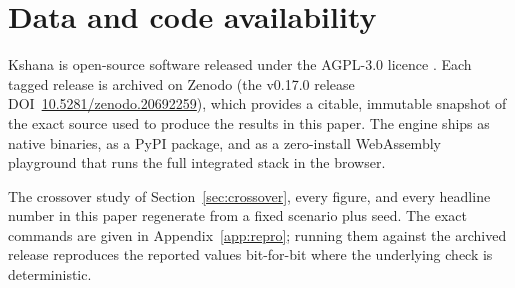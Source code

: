 \section*{Data and code availability}

Kshana is open-source software released under the AGPL-3.0 licence
\citep{baweja2026kshana}. Each tagged release is archived on Zenodo
(the v0.17.0 release DOI~\href{https://doi.org/10.5281/zenodo.20692259}{10.5281/zenodo.20692259}),
which provides a citable, immutable snapshot of the exact source used to produce
the results in this paper. The engine ships as native binaries, as a PyPI package,
and as a zero-install WebAssembly playground that runs the full integrated stack
in the browser.

The crossover study of Section~\ref{sec:crossover}, every figure, and every
headline number in this paper regenerate from a fixed scenario plus seed. The exact
commands are given in Appendix~\ref{app:repro}; running them against the archived
release reproduces the reported values bit-for-bit where the underlying check is
deterministic.
